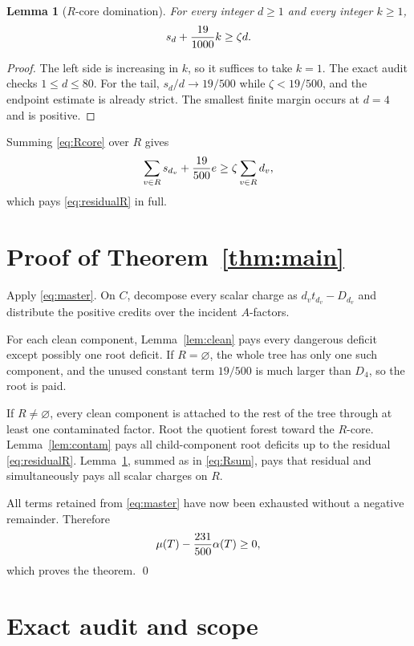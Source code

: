 \documentclass[11pt]{article}
\newtheorem{lemma}[theorem]{Lemma}
\begin{document}
\begin{lemma}[$R$-core domination]\label{lem:Rcore}
For every integer $d\ge1$ and every integer $k\ge1$,
\begin{equation}\label{eq:Rcore}
 s_d+{19\over1000}k\ge \zeta d.
\end{equation}
\end{lemma}

\begin{proof}
The left side is increasing in $k$, so it suffices to take $k=1$.  The exact audit checks $1\le d\le80$.  For the tail, $s_d/d\to19/500$ while $\zeta<19/500$, and the endpoint estimate is already strict.  The smallest finite margin occurs at $d=4$ and is positive.
\end{proof}

Summing \eqref{eq:Rcore} over $R$ gives
\begin{equation}\label{eq:Rsum}
 \sum_{v\in R}s_{d_v}+{19\over500}e
 \ge
 \zeta\sum_{v\in R}d_v,
\end{equation}
which pays \eqref{eq:residualR} in full.

\section{Proof of Theorem~\ref{thm:main}}

Apply \eqref{eq:master}.  On $C$, decompose every scalar charge as $d_vt_{d_v}-D_{d_v}$ and distribute the positive credits over the incident $A$-factors.

For each clean component, Lemma~\ref{lem:clean} pays every dangerous deficit except possibly one root deficit.  If $R=\varnothing$, the whole tree has only one such component, and the unused constant term $19/500$ is much larger than $D_4$, so the root is paid.

If $R\ne\varnothing$, every clean component is attached to the rest of the tree through at least one contaminated factor.  Root the quotient forest toward the $R$-core.  Lemma~\ref{lem:contam} pays all child-component root deficits up to the residual \eqref{eq:residualR}.  Lemma~\ref{lem:Rcore}, summed as in \eqref{eq:Rsum}, pays that residual and simultaneously pays all scalar charges on $R$.

All terms retained from \eqref{eq:master} have now been exhausted without a negative remainder.  Therefore
\[
 \mu(T)-{231\over500}\alpha(T)\ge0,
\]
which proves the theorem.
\qed

\section{Exact audit and scope}
\end{document}

